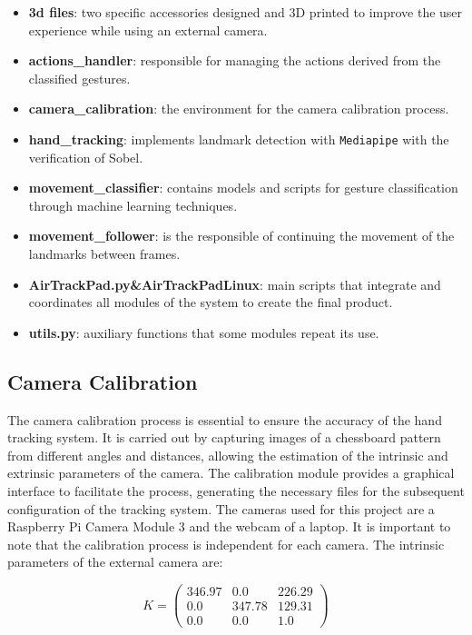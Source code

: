 \documentclass[a4paper,12pt]{article}
\begin{document}
{\begin{itemize}
  \item \textbf{3d files}: two specific accessories designed and 3D printed to improve the user experience while using an external camera.
  \item \textbf{actions\_handler}: responsible for managing the actions derived from the classified gestures.
  \item \textbf{camera\_calibration}: the environment for the camera calibration process.
  \item \textbf{hand\_tracking}: implements landmark detection with \texttt{Mediapipe} with the verification of Sobel.
  \item \textbf{movement\_classifier}: contains models and scripts for gesture classification through machine learning techniques.
  \item \textbf{movement\_follower}: is the responsible of continuing the movement of the landmarks between frames.
  \item \textbf{AirTrackPad.py\&AirTrackPadLinux}: main scripts that integrate and coordinates all modules of the system to create the final product.
  \item \textbf{utils.py}: auxiliary functions that some modules repeat its use.
\end{itemize}


\subsection{Camera Calibration}

The camera calibration process is essential to ensure the accuracy of the hand tracking system. It is carried out by capturing images of a chessboard 
pattern from different angles and distances, allowing the estimation of the intrinsic and extrinsic parameters of the camera. The calibration module 
provides a graphical interface to facilitate the process, generating the necessary files for the subsequent configuration of the tracking system.
The cameras used for this project are a Raspberry Pi Camera Module 3 and the webcam of a laptop. It is important to note that the calibration process
is independent for each camera. The intrinsic parameters of the external camera are:

\begin{equation}
K = \begin{pmatrix}
346.97 & 0.0 & 226.29 \\
0.0 & 347.78 & 129.31 \\
0.0 & 0.0 & 1.0
\end{pmatrix}
\end{equation}

}
\end{document}
